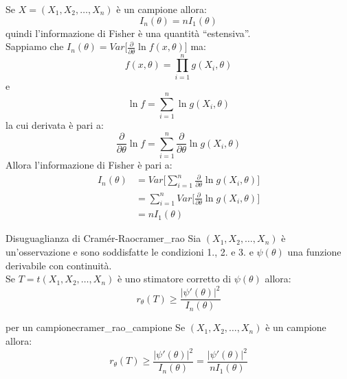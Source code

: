\documentclass[12pt]{report}
\newcounter{theorem}
\newcommand{\nmu}{}
\begin{document}
	Se $X = (X_1, X_2, \dots, X_n)$ è un campione allora:
	\[
	I_n(\theta) = nI_1(\theta)
	\]
	quindi l'informazione di Fisher è una quantità ``estensiva''. \\
	Sappiamo che $I_n(\theta) = Var\Big[\frac{\partial}{\partial \theta}\ln f(x, \theta)\Big]$ ma:
	\[
	f(x, \theta) = \prod_{i=1}^{n}g(X_i, \theta)
	\]
	e
	\[
	\ln f = \sum_{i=1}^{n}\ln g(X_i, \theta)
	\]
	la cui derivata è pari a:
	\[
	\frac{\partial}{\partial \theta} \ln f = \sum_{i=1}^{n}\frac{\partial}{\partial \theta}\ln g(X_i, \theta)
	\]
	Allora l'informazione di Fisher è pari a:
	\begin{align*}
	I_n(\theta) &= Var\Bigg[\sum_{i=1}^{n}\frac{\partial}{\partial \theta}\ln g(X_i, \theta)\Bigg] \\
 	&= \sum_{i=1}^{n}Var\Bigg[\frac{\partial}{\partial \theta}\ln g(X_i, \theta)\Bigg] \\
	 &= nI_1(\theta)
 	\end{align*}
	 \begin{theorem}{\nmu Disuguaglianza di Cramér-Rao}{cramer_rao}
	 	Sia $(X_1, X_2, \dots, X_n)$ è un'osservazione e sono soddisfatte le condizioni 1., 2. e 3. e $\psi(\theta)$ una funzione derivabile con continuità. \\
	 	Se $T = t(X_1, X_2, \dots, X_n)$ è uno stimatore corretto di $\psi(\theta)$ allora:
	 	\[
	 	r_\theta(T) \geq \frac{|\psi'(\theta)|^2}{I_n(\theta)}
	 	\]
	 \end{theorem}
	 \begin{note}{\nmu {} per un campione}{cramer_rao_campione}
	 	Se $(X_1, X_2, \dots, X_n)$ è un campione allora:
	 	\[
	 	r_\theta(T) \geq \frac{|\psi'(\theta)|^2}{I_n(\theta)} = \frac{|\psi'(\theta)|^2}{nI_1(\theta)}
	 	\]
	 \end{note}
\end{document}
